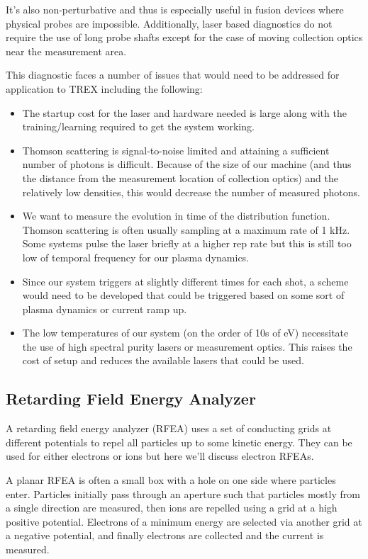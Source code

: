 It's also non-perturbative and thus is especially useful in fusion devices where physical probes are impossible. Additionally, laser based diagnostics do not require the use of long probe shafts except for the case of moving collection optics near the measurement area.

This diagnostic faces a number of issues that would need to be addressed for application to TREX including the following:
\begin{itemize}
    \item The startup cost for the laser and hardware needed is large along with the training/learning required to get the system working.
    \item Thomson scattering is signal-to-noise limited and attaining a sufficient number of photons is difficult. Because of the size of our machine (and thus the distance from the measurement location of collection optics) and the relatively low densities, this would decrease the number of measured photons.
    \item We want to measure the evolution in time of the distribution function. Thomson scattering is often usually sampling at a maximum rate of 1 kHz. Some systems pulse the laser briefly at a higher rep rate but this is still too low of temporal frequency for our plasma dynamics.
    \item Since our system triggers at slightly different times for each shot, a scheme would need to be developed that could be triggered based on some sort of plasma dynamics or current ramp up.
    \item The low temperatures of our system (on the order of 10s of eV) necessitate the use of high spectral purity lasers or measurement optics. This raises the cost of setup and reduces the available lasers that could be used.
\end{itemize}

\subsection{Retarding Field Energy Analyzer}

A retarding field energy analyzer (RFEA) uses a set of conducting grids at different potentials to repel all particles up to some kinetic energy. They can be used for either electrons or ions but here we'll discuss electron RFEAs.

A planar RFEA is often a small box with a hole on one side where particles enter. Particles initially pass through an aperture such that particles mostly from a single direction are measured, then ions are repelled using a grid at a high positive potential. Electrons of a minimum energy are selected via another grid at a negative potential, and finally electrons are collected and the current is measured.

